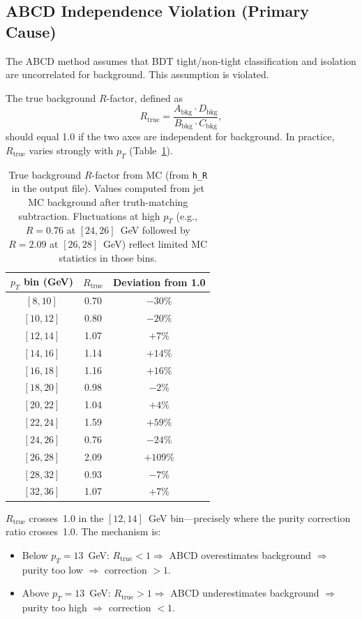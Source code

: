 \documentclass[11pt,a4paper]{article}
\begin{document}
\subsection{ABCD Independence Violation (Primary Cause)}
\label{sec:independence}

The ABCD method assumes that BDT tight/non-tight classification and isolation
are uncorrelated for background. This assumption is violated.

The true background $R$-factor, defined as
\begin{equation}
R_{\mathrm{true}} = \frac{A_{\mathrm{bkg}} \cdot D_{\mathrm{bkg}}}{B_{\mathrm{bkg}} \cdot C_{\mathrm{bkg}}},
\end{equation}
should equal 1.0 if the two axes are independent for background. In practice,
$R_{\mathrm{true}}$ varies strongly with $p_T$ (Table~\ref{tab:rtrue}).

\begin{table}[H]
\centering
\caption{True background $R$-factor from MC (from \texttt{h\_R} in the output file).
         Values computed from jet MC background after truth-matching subtraction.
         Fluctuations at high $p_T$ (e.g., $R=0.76$ at $[24,26]$~GeV followed by
         $R=2.09$ at $[26,28]$~GeV) reflect limited MC statistics in those bins.}
\label{tab:rtrue}
\begin{tabular}{@{}ccc@{}}
\toprule
$p_T$ bin (GeV) & $R_{\mathrm{true}}$ & Deviation from 1.0 \\
\midrule
$[8,10]$   & 0.70 & $-30\%$ \\
$[10,12]$  & 0.80 & $-20\%$ \\
$[12,14]$  & 1.07 & $+7\%$  \\
$[14,16]$  & 1.14 & $+14\%$ \\
$[16,18]$  & 1.16 & $+16\%$ \\
$[18,20]$  & 0.98 & $-2\%$  \\
$[20,22]$  & 1.04 & $+4\%$  \\
$[22,24]$  & 1.59 & $+59\%$ \\
$[24,26]$  & 0.76 & $-24\%$ \\
$[26,28]$  & 2.09 & $+109\%$ \\
$[28,32]$  & 0.93 & $-7\%$  \\
$[32,36]$  & 1.07 & $+7\%$  \\
\bottomrule
\end{tabular}
\end{table}

$R_{\mathrm{true}}$ crosses~1.0 in the $[12,14]$~GeV bin---precisely where
the purity correction ratio crosses~1.0. The mechanism is:
\begin{itemize}
\item Below $p_T = 13$~GeV: $R_{\mathrm{true}} < 1 \Rightarrow$ ABCD overestimates
      background $\Rightarrow$ purity too low $\Rightarrow$ correction $> 1$.
\item Above $p_T = 13$~GeV: $R_{\mathrm{true}} > 1 \Rightarrow$ ABCD underestimates
      background $\Rightarrow$ purity too high $\Rightarrow$ correction $< 1$.
\end{itemize}
\end{document}
